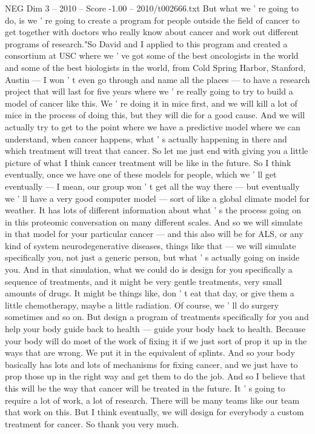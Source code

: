 \begin{textsample}{NEG Dim 3 – 2010 – Score -1.00 – 2010/t002666.txt}
But what we ' re going to do, is we ' re going to create a program for people outside the field of cancer to get together with doctors who really know about cancer and work out different programs of research."So David and I applied to this program and created a consortium at USC where we ' ve got some of the best oncologists in the world and some of the best biologists in the world, from Cold Spring Harbor, Stanford, Austin — I won ' t even go through and name all the places — to have a research project that will last for five years where we ' re really going to try to build a model of cancer like this.
We ' re doing it in mice first, and we will kill a lot of mice in the process of doing this, but they will die for a good cause.
And we will actually try to get to the point where we have a predictive model where we can understand, when cancer happens, what ' s actually happening in there and which treatment will treat that cancer.
So let me just end with giving you a little picture of what I think cancer treatment will be like in the future.
So I think eventually, once we have one of these models for people, which we ' ll get eventually — I mean, our group won ' t get all the way there — but eventually we ' ll have a very good computer model — sort of like a global climate model for weather.
It has lots of different information about what ' s the process going on in this proteomic conversation on many different scales.
And so we will simulate in that model for your particular cancer — and this also will be for ALS, or any kind of system neurodegenerative diseases, things like that — we will simulate specifically you, not just a generic person, but what ' s actually going on inside you.
And in that simulation, what we could do is design for you specifically a sequence of treatments, and it might be very gentle treatments, very small amounts of drugs.
It might be things like, don ' t eat that day, or give them a little chemotherapy, maybe a little radiation.
Of course, we ' ll do surgery sometimes and so on.
But design a program of treatments specifically for you and help your body guide back to health — guide your body back to health.
Because your body will do most of the work of fixing it if we just sort of prop it up in the ways that are wrong.
We put it in the equivalent of splints.
And so your body basically has lots and lots of mechanisms for fixing cancer, and we just have to prop those up in the right way and get them to do the job.
And so I believe that this will be the way that cancer will be treated in the future.
It ' s going to require a lot of work, a lot of research.
There will be many teams like our team that work on this.
But I think eventually, we will design for everybody a custom treatment for cancer.
So thank you very much.

\end{textsample}
